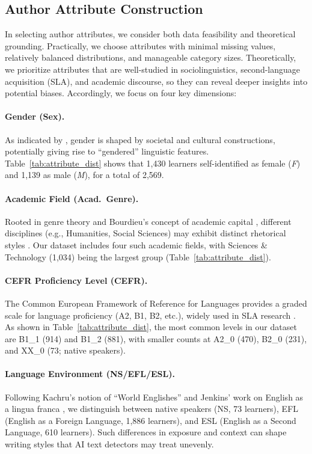 \subsection{Author Attribute Construction}
In selecting author attributes, we consider both data feasibility and theoretical grounding. Practically, we choose attributes with minimal missing values, relatively balanced distributions, and manageable category sizes. Theoretically, we prioritize attributes that are well-studied in sociolinguistics, second-language acquisition (SLA), and academic discourse, so they can reveal deeper insights into potential biases. Accordingly, we focus on four key dimensions:


\paragraph{Gender (Sex).}
As indicated by \citet{cameron2005language,gal2012language}, gender is shaped by societal and cultural constructions, potentially giving rise to “gendered” linguistic features. Table~\ref{tab:attribute_dist} shows that 1,430 learners self-identified as female (\emph{F}) and 1,139 as male (\emph{M}), for a total of 2,569.

\paragraph{Academic Field (Acad.\ Genre).}
Rooted in genre theory \citep{swales2014genre} and Bourdieu’s concept of academic capital \citep{bourdieu1991language}, different disciplines (e.g., Humanities, Social Sciences) may exhibit distinct rhetorical styles \citep{hyland2000disciplinary}. Our dataset includes four such academic fields, with Sciences \& Technology (1,034) being the largest group (Table~\ref{tab:attribute_dist}).

\paragraph{CEFR Proficiency Level (CEFR).}
The Common European Framework of Reference for Languages \citep{council2001common} provides a graded scale for language proficiency (A2, B1, B2, etc.), widely used in SLA research \citep{krashen2006input,long1996role,lantolf2000sociocultural}. As shown in Table~\ref{tab:attribute_dist}, the most common levels in our dataset are B1\_1 (914) and B1\_2 (881), with smaller counts at A2\_0 (470), B2\_0 (231), and XX\_0 (73; native speakers).

\paragraph{Language Environment (NS/EFL/ESL).}
Following Kachru’s notion of “World Englishes” \citep{kachru1985standards} and Jenkins’ work on English as a lingua franca \citep{jenkins2003world}, we distinguish between native speakers (NS, 73 learners), EFL (English as a Foreign Language, 1,886 learners), and ESL (English as a Second Language, 610 learners). Such differences in exposure and context can shape writing styles that AI text detectors may treat unevenly.


